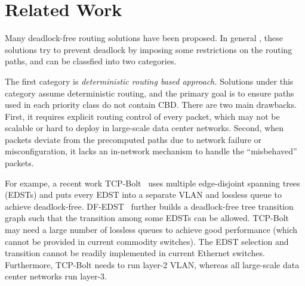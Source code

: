 \section{Related Work}\label{sec:related}




Many deadlock-free routing solutions \cite{dally,duato93,dally93,sancho2004,flich2012survey,lash,wu2003fault,glass,duato2001,domke2011,puente1999,dfedst16} have been proposed. In general , these solutions try to prevent deadlock by imposing some restrictions on the routing paths, and can be classfied into two categories. 

The first category is {\em deterministic routing based approach.} Solutions under this category assume deterministic routing, and the primary goal is to ensure paths used in each priority class do not contain CBD. There are two main drawbacks. First, it requires explicit routing control of every packet, which may not be scalable or hard to deploy in large-scale data center networks. Second, when packets deviate from the precomputed paths due to network failure or misconfiguration, it lacks an in-network mechanism to handle the ``misbehaved'' packets. 

For exampe, a recent work TCP-Bolt~\cite{tcpbolt} uses multiple edge-disjoint spanning trees (EDSTs) and puts every EDST into a separate VLAN and lossless queue to achieve deadlock-free. DF-EDST~\cite{dfedst16} further builds a deadlock-free tree transition graph such that the transition among some EDSTs can be allowed. TCP-Bolt may need a large number of lossless queues to achieve good performance (which cannot be provided in current commodity switches). The EDST selection and transition cannot be readily implemented in current Ethernet switches. Furthermore, TCP-Bolt needs to run layer-2 VLAN, whereas all large-scale data center networks run layer-3. 

